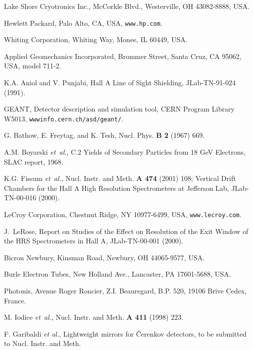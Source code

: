 \begin{thebibliography}{99}
 Lake Shore Cryotronics Inc.,
 McCorkle Blvd., Westerville, OH 43082-8888, USA. 

 Hewlett Packard,
\newblock Palo Alto, CA, USA, {\tt www.hp.com}.

 Whiting Corporation,
 Whiting Way, Monee, IL 60449, USA. 


 Applied Geomechanics Incorporated,
 Brommer Street, Santa Cruz, CA 95062, USA, model 711-2.

 K.A. Aniol and V. Punjabi,
\newblock Hall A Line of Sight 
Shielding, JLab-TN-91-024 (1991).

 GEANT, Detector description and simulation tool, CERN 
Program Library W5013, {\tt wwwinfo.cern.ch/asd/geant/}.

 G. Bathow, E. Freytag, and K. Tesh,
\newblock Nucl. Phys. {\bf B 2} (1967) 669.

 A.M. Boyarski {\em et~al.},
\newblock C.2 Yields of Secondary Particles from 18 GeV Electrons, 
SLAC report, 1968.

K.G. Fissum {\em et~al.},
\newblock Nucl. Instr. and Meth. {\bf A 474} (2001) 108; Vertical Drift Chambers for the Hall A High Resolution
Spectrometers at Jefferson Lab, JLab-TN-00-016 (2000). 

 LeCroy Corporation,
\newblock Chestnut Ridge, NY 10977-6499, USA, {\tt www.lecroy.com}.

 J.~LeRose,
\newblock Report on Studies of the Effect on Resolution of the Exit 
Window of the HRS Spectrometers in Hall A, 
JLab-TN-00-001 (2000).

 Bicron Newbury,
 Kinsman Road, Newbury, OH 44065-9577, USA.

 Burle Electron Tubes,
 New Holland Ave., Lancaster, PA 17601-5688, USA.

 Photonis,
\newblock Avenue Roger Roncier, Z.I. Beauregard, 
B.P. 520, 19106 Brive Cedex, France.

 M. Iodice {\em et~al.},
\newblock Nucl. Instr. and Meth. {\bf A 411} (1998) 223.

 F. Garibaldi {\em et al.},
\newblock Lightweight mirrors for \v{C}erenkov detectors, 
to be submitted to Nucl. Instr. and Meth.


\end{thebibliography}
